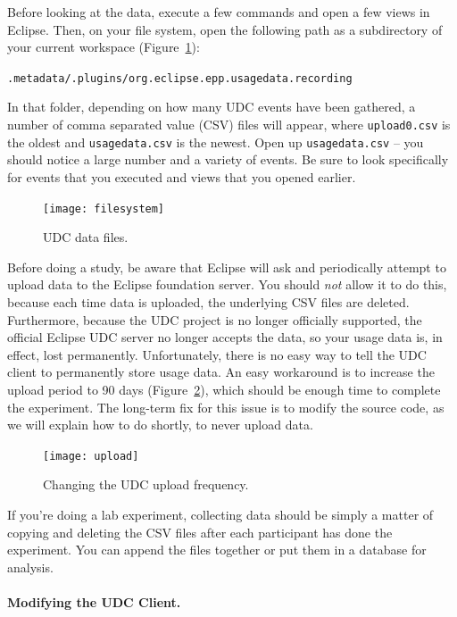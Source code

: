 Before looking at the data, execute a few commands and open a few views 
in Eclipse.
Then, on your file system, open the following path as a subdirectory
of your current workspace (Figure~\ref{fig:filesystem}): 

\vspace{4mm}
\texttt{.metadata/.plugins/org.eclipse.epp.usagedata.recording}
\vspace{4mm}

\noindent
In that folder, depending on how many UDC events have been gathered,
a number of comma separated value (CSV) files will appear, where \texttt{upload0.csv} is the oldest
and \texttt{usagedata.csv} is the newest.
Open up \texttt{usagedata.csv} -- you should notice a large number and a variety of events.
Be sure to look specifically for events that you executed and views that you opened earlier.

\begin{figure}
  \centering
  \texttt{[image: filesystem]}
  \caption{UDC data files.}\label{fig:filesystem}
\end{figure}

Before doing a study, be aware that Eclipse will ask and periodically attempt to upload
data to the Eclipse foundation server.
You should \emph{not} allow it to do this, because each time data is uploaded, the underlying
CSV files are deleted.
Furthermore, because the UDC project is no longer officially supported, the official Eclipse
UDC server no longer accepts the data, so your usage data is, in effect, lost permanently.
Unfortunately, there is no easy way to tell the UDC client to permanently store
usage data.
An easy workaround is to increase the upload period to 90 days (Figure~\ref{fig:upload}),
which should be enough time to complete the experiment.
The long-term fix for this issue is to modify the source code, as we will explain
how to do shortly, to never upload data.

\begin{figure}
  \centering
  \texttt{[image: upload]}
  \caption{Changing the UDC upload frequency.}\label{fig:upload}
\end{figure}

If you're doing a lab experiment, collecting data should be simply a matter of 
copying and deleting the CSV files after each participant has done the experiment.
You can append the files together or put them in a database for analysis.

\paragraph{Modifying the UDC Client.}

